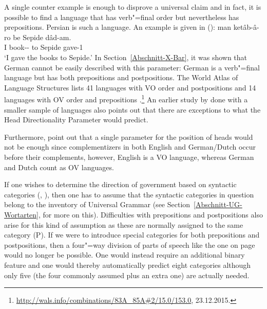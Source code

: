 A single counter example is enough to disprove a universal  claim and in fact, it is possible to
find a language that has verb"=final order but nevertheless has prepositions.
Persian is such a language. An example is given in ():
\ea
\gll man ketâb-â-ro be Sepide dâd-am.\\
     I book-\pl-\RA{} to Sepide gave-1\sg\\
\glt `I gave the books to Sepide.'
\z
In Section~\ref{Abschnitt-X-Bar}, it was shown that German cannot be easily described with this parameter: German is a verb"=final language but has both
prepositions and postpositions. The World Atlas of Language Structures lists 41 languages with VO
order and postpositions and 14 languages with OV order and prepositions \citep{wals-83,wals-85}.\footnote{
  \url{http://wals.info/combinations/83A_85A\#2/15.0/153.0}, 23.12.2015.
} An earlier study by \citet{Dryer92a} done with a smaller sample of languages also points out that
there are exceptions to what the Head Directionality Parameter would predict. 

Furthermore, \citet[]{GW94a} point out that a single parameter for the position of heads would not be enough since complementizers in both English and German/Dutch
occur before their complements, however, English is a VO language, whereas German and Dutch count as OV languages.

If one wishes to determine the direction of government based on syntactic categories (\citealp[]{GW94a}, \citealp[]{Chomsky2005a}), then one has to assume
that the syntactic categories in question belong to the inventory of Universal Grammar (see Section~\ref{Abschnitt-UG-Wortarten}, for more on this).
Difficulties with prepositions and postpositions also arise for this kind of assumption as these are normally assigned to the same category (P).
If we were to introduce special categories for both prepositions and postpositions, then a four"=way
division of parts of speech like the one on page~\pageref{Tabelle-Merkmalszerlegung-Wortarten} would
no longer be possible. One would instead require an additional binary feature and one would thereby
automatically predict eight categories although only five (the four commonly assumed plus an extra one) are actually needed.

